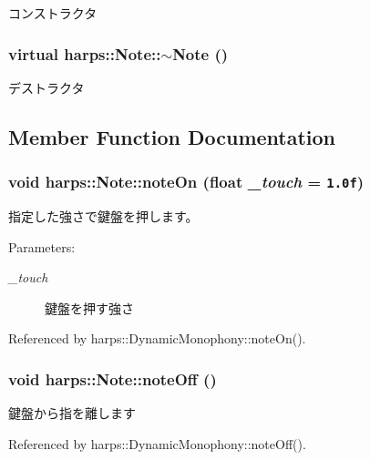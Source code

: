コンストラクタ 
\subsubsection[$\sim$Note]{\setlength{\rightskip}{0pt plus 5cm}virtual harps::Note::$\sim$Note ()\hspace{0.3cm}{\tt  [inline, virtual]}}\label{classharps_1_1Note_9a7a81b989b96e47da4f32e49db991ba}


デストラクタ 

\subsection{Member Function Documentation}
\subsubsection[noteOn]{\setlength{\rightskip}{0pt plus 5cm}void harps::Note::noteOn (float {\em \_\-touch} = {\tt 1.0f})\hspace{0.3cm}{\tt  [inline]}}\label{classharps_1_1Note_f589da8cf6f57aa65d484909bb1eb61b}


指定した強さで鍵盤を押します。 \begin{Desc}
\item[Parameters:]
\begin{description}
\item[{\em \_\-touch}]鍵盤を押す強さ \end{description}
\end{Desc}


Referenced by harps::DynamicMonophony::noteOn().
\subsubsection[noteOff]{\setlength{\rightskip}{0pt plus 5cm}void harps::Note::noteOff ()\hspace{0.3cm}{\tt  [inline]}}\label{classharps_1_1Note_99f66a9ff92dd3ad30199816c455fa78}


鍵盤から指を離します 

Referenced by harps::DynamicMonophony::noteOff().
